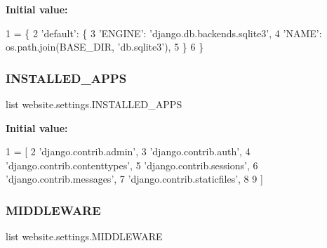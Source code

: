 {\bfseries Initial value\+:}
\begin{DoxyCode}
1 =  \{
2     \textcolor{stringliteral}{'default'}: \{
3         \textcolor{stringliteral}{'ENGINE'}: \textcolor{stringliteral}{'django.db.backends.sqlite3'},
4         \textcolor{stringliteral}{'NAME'}: os.path.join(BASE\_DIR, \textcolor{stringliteral}{'db.sqlite3'}),
5     \}
6 \}
\end{DoxyCode}
\mbox{\label{namespacewebsite_1_1settings_a18595aa318c4e664c67769f222190c59}} 
\subsubsection{\texorpdfstring{I\+N\+S\+T\+A\+L\+L\+E\+D\+\_\+\+A\+P\+PS}{INSTALLED\_APPS}}
{\footnotesize\ttfamily list website.\+settings.\+I\+N\+S\+T\+A\+L\+L\+E\+D\+\_\+\+A\+P\+PS}

{\bfseries Initial value\+:}
\begin{DoxyCode}
1 =  [
2     \textcolor{stringliteral}{'django.contrib.admin'},
3     \textcolor{stringliteral}{'django.contrib.auth'},
4     \textcolor{stringliteral}{'django.contrib.contenttypes'},
5     \textcolor{stringliteral}{'django.contrib.sessions'},
6     \textcolor{stringliteral}{'django.contrib.messages'},
7     \textcolor{stringliteral}{'django.contrib.staticfiles'},
8     
9 ]
\end{DoxyCode}
\mbox{\label{namespacewebsite_1_1settings_adf5979aa8292af8369619f3b759cb7cf}} 
\subsubsection{\texorpdfstring{M\+I\+D\+D\+L\+E\+W\+A\+RE}{MIDDLEWARE}}
{\footnotesize\ttfamily list website.\+settings.\+M\+I\+D\+D\+L\+E\+W\+A\+RE}

